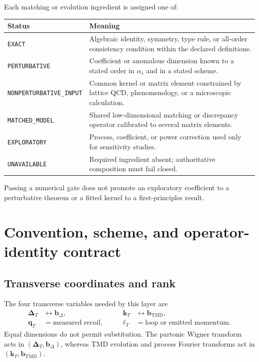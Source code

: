 \documentclass[11pt]{article}
\newcommand{\kT}{\bm{k}_{T}}
\newcommand{\ellT}{\bm{\ell}_{T}}
\newcommand{\qT}{\bm{q}_{T}}
\newcommand{\DT}{\bm{\Delta}_{T}}
\newcommand{\bD}{\bm{b}_{\Delta}}
\newcommand{\bM}{\bm{b}_{\mathrm{TMD}}}
\begin{document}
Each matching or evolution ingredient is assigned one of:
\begin{longtable}{L{0.25\textwidth}L{0.65\textwidth}}
\toprule
Status & Meaning\\
\midrule
\endhead
\texttt{EXACT} & Algebraic identity, symmetry, type rule, or all-order
consistency condition within the declared definitions.\\
\texttt{PERTURBATIVE} & Coefficient or anomalous dimension known to a stated
order in \(\alpha_s\) and in a stated scheme.\\
\texttt{NONPERTURBATIVE\_INPUT} & Common kernel or matrix element constrained
by lattice QCD, phenomenology, or a microscopic calculation.\\
\texttt{MATCHED\_MODEL} & Shared low-dimensional matching or discrepancy
operator calibrated to several matrix elements.\\
\texttt{EXPLORATORY} & Process, coefficient, or power correction used only for
sensitivity studies.\\
\texttt{UNAVAILABLE} & Required ingredient absent; authoritative composition
must fail closed.\\
\bottomrule
\end{longtable}
Passing a numerical gate does not promote an exploratory coefficient to a
perturbative theorem or a fitted kernel to a first-principles result.

\section{Convention, scheme, and operator-identity contract}
\label{sec:types}

\subsection{Transverse coordinates and rank}

The four transverse variables needed by this layer are
\begin{equation}
 \begin{aligned}
 \DT&\leftrightarrow\bD,
 &\qquad
 \kT&\leftrightarrow\bM,\\
 \qT&=\text{measured recoil},
 &\qquad
 \ellT&=\text{loop or emitted momentum}.
 \end{aligned}
 \label{eq:coordinate-contract}
\end{equation}
Equal dimensions do not permit substitution.  The partonic Wigner transform
acts in \((\DT,\bD)\), whereas TMD evolution and process Fourier transforms
act in \((\kT,\bM)\).
\end{document}
